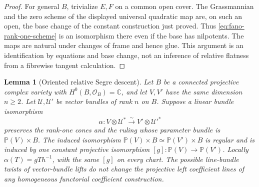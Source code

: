 \documentclass[11pt,reqno]{amsart}
\numberwithin{equation}{section}
\newtheorem{lemma}[theorem]{Lemma}
\theoremstyle{definition}\newtheorem{definition}[theorem]{Definition}
\theoremstyle{remark}\newtheorem{remark}[theorem]{Remark}
\newcommand{\C}{\mathbb C}\newcommand{\Q}{\mathbb Q}
\newcommand{\Pj}{\mathbb P}\newcommand{\A}{\mathbb A}
\newcommand{\OO}{\mathcal O}\newcommand{\II}{\mathcal I}
\begin{document}
\begin{proof}
For general \(B\), trivialize \(E,F\) on a common open cover.
The Grassmannian and the zero scheme of the displayed universal
quadratic map are, on such an open, the base change of the constant
construction just proved.  Thus \eqref{eq:fano-rank-one-scheme} is
an isomorphism there even if the base has nilpotents.  The maps are
natural under changes of frame and hence glue.  This argument is
an identification by equations and base change, not an inference of
relative flatness from a fibrewise tangent calculation.
\end{proof}


\begin{lemma}[Oriented relative Segre descent]
\label{lem:oriented-segre-descent}
Let \(B\) be a connected projective complex variety with
\(H^0(B,\OO_B)=\C\), and let \(V,V'\) have the same dimension
\(n\ge2\).  Let \(\mathcal U,\mathcal U'\) be vector bundles
of rank \(n\) on \(B\).  Suppose a linear bundle isomorphism
\[
 \alpha:V\otimes\mathcal U^*\xrightarrow{\sim}
                         V'\otimes\mathcal U'^*
\]
preserves the rank-one cones and the ruling whose parameter bundle
is \(\Pj(V)\times B\).  The induced isomorphism
\(\Pj(V)\times B\simeq\Pj(V')\times B\) is regular and is
induced by one constant projective isomorphism \([g]:\Pj(V)\to\Pj(V')\).
Locally \(\alpha(T)=gTh^{-1}\), with the same \([g]\) on every
chart.  The possible line-bundle twists of vector-bundle lifts do
not change the projective left coefficient lines of any homogeneous
functorial coefficient construction.
\end{lemma}
\end{document}
